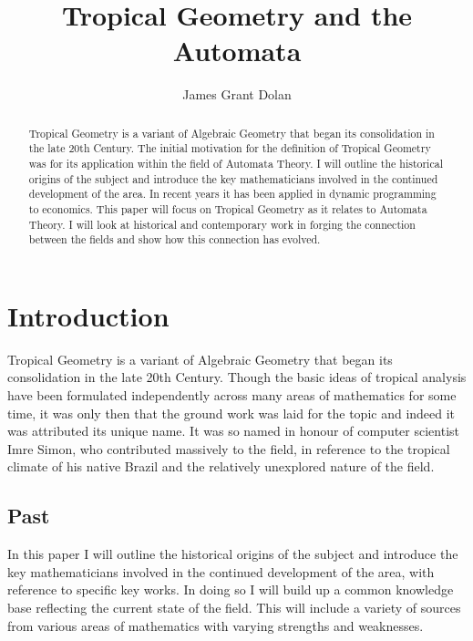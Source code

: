 \documentclass[12pt,a4paper]{amsart}
\theoremstyle{definition}
\theoremstyle{remark}
\begin{document}
%
%
\title{Tropical Geometry and the Automata}
\author{James Grant Dolan}
\begin{abstract}
Tropical Geometry is a variant of Algebraic Geometry that began its consolidation in the late 20th Century. The initial motivation for the definition of Tropical Geometry was for its application within the field of Automata Theory. I will outline the historical origins of the subject and introduce the key mathematicians involved in the continued development of the area. In recent years it has been applied in dynamic programming to economics. This paper will focus on Tropical Geometry as it relates to Automata Theory. I will look at historical and contemporary work in forging the connection between the fields and show how this connection has evolved.
\end{abstract}
\maketitle
%
%

%
%

\tableofcontents

\newpage
\section*{Introduction}

Tropical Geometry is a variant of Algebraic Geometry that began its consolidation in the late 20th Century.
Though the basic ideas of tropical analysis have been formulated independently across many areas of mathematics for some time, it was only then that the ground work was laid for the topic and indeed it was attributed its unique name.
It was so named in honour of computer scientist Imre Simon, who contributed massively to the field\cite{10.1007/BFb0017135}, in reference to the tropical climate of his native Brazil and the relatively unexplored nature of the field.

\subsection*{Past}
In this paper I will outline the historical origins of the subject and introduce the key mathematicians involved in the continued development of the area, with reference to specific key works.
In doing so I will build up a common knowledge base reflecting the current state of the field.
This will include a variety of sources from various areas of mathematics with varying strengths and weaknesses.
\end{document}
